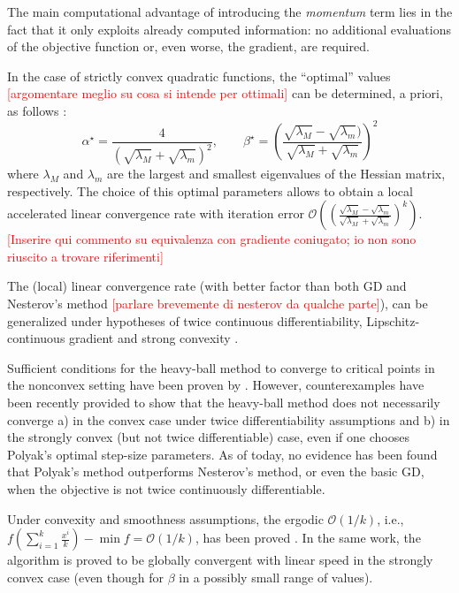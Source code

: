\documentclass[a4paper, 11pt, openany]{article}
\theoremstyle{plain}%
\theoremstyle{definition}
\begin{document}
	The main computational advantage of introducing the \textit{momentum} term lies in the fact that it only exploits already computed information: no additional evaluations of the objective function or, even worse, the gradient, are required.
	
	In the case of strictly convex quadratic functions, the ``optimal'' values \textcolor{red}{[argomentare meglio su cosa si intende per ottimali]} can be determined, a priori, as follows \cite{polyak1987introduction}:
	$$\alpha^\star = \frac{4}{(\sqrt{\lambda_M} + \sqrt{\lambda_m})^2},\qquad \beta^\star = \left(\frac{\sqrt{\lambda_M} - \sqrt{\lambda_m})}{\sqrt{\lambda_M} + \sqrt{\lambda_m}}\right)^2$$
	where $\lambda_M$ and $\lambda_m$ are the largest and smallest eigenvalues of the Hessian matrix, respectively. The choice of this optimal parameters allows to obtain a local accelerated linear	convergence rate with iteration error $\mathcal{O}((\frac{\sqrt{\lambda_M} - \sqrt{\lambda_m}}{\sqrt{\lambda_M} + \sqrt{\lambda_m}})^k)$. \textcolor{red}{[Inserire qui commento su equivalenza con gradiente coniugato; io non sono riuscito a trovare riferimenti]}
	
	The (local) linear convergence rate (with better factor than both GD and Nesterov's method \textcolor{red}{[parlare brevemente di nesterov da qualche parte]}), can be generalized under hypotheses of twice continuous differentiability, Lipschitz-continuous gradient and strong convexity \cite{polyak1964some}.  
	
	Sufficient conditions for the heavy-ball method to converge to critical points in the nonconvex setting have been proven by \cite{zavriev1993heavy}. However, counterexamples have been recently provided \cite{lessard2016analysis} to show that the heavy-ball method does not necessarily converge a) in the convex case under twice differentiability assumptions and b) in the strongly convex (but not twice differentiable) case, even if one chooses Polyak's optimal step-size parameters. 
	As of today, no evidence has been found that Polyak's method outperforms Nesterov’s method, or even the basic GD, when the objective is not twice continuously differentiable. 
	
	Under convexity and smoothness assumptions,
	the ergodic $\mathcal{O}(1/k)$, i.e., $f(\sum_{i=1}^{k}\frac{x^i}{k}) - \min f = \mathcal{O}(1/k)$, has been proved \cite{ghadimi2015global}. In the same work, the algorithm is proved to be globally convergent with linear speed in the strongly convex case (even though for $\beta$ in a possibly small range of values).
	
\end{document}
